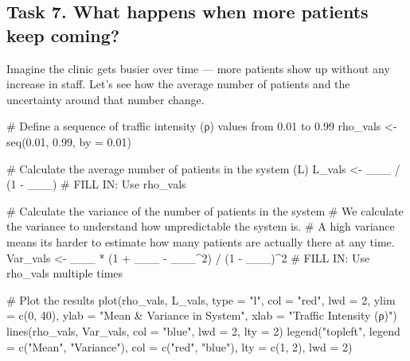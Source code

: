 \documentclass[
]{article}
\newenvironment{Shaded}{\begin{snugshade}}{\end{snugshade}}
\newcommand{\AttributeTok}[1]{\textcolor[rgb]{0.40,0.45,0.13}{#1}}
\newcommand{\CommentTok}[1]{\textcolor[rgb]{0.37,0.37,0.37}{#1}}
\newcommand{\DecValTok}[1]{\textcolor[rgb]{0.68,0.00,0.00}{#1}}
\newcommand{\FloatTok}[1]{\textcolor[rgb]{0.68,0.00,0.00}{#1}}
\newcommand{\FunctionTok}[1]{\textcolor[rgb]{0.28,0.35,0.67}{#1}}
\newcommand{\NormalTok}[1]{\textcolor[rgb]{0.00,0.23,0.31}{#1}}
\newcommand{\OtherTok}[1]{\textcolor[rgb]{0.00,0.23,0.31}{#1}}
\newcommand{\SpecialCharTok}[1]{\textcolor[rgb]{0.37,0.37,0.37}{#1}}
\newcommand{\StringTok}[1]{\textcolor[rgb]{0.13,0.47,0.30}{#1}}
\begin{document}
\subsection{Task 7. What happens when more patients keep
coming?}\label{task-7.-what-happens-when-more-patients-keep-coming}

Imagine the clinic gets busier over time --- more patients show up
without any increase in staff. Let's see how the average number of
patients and the uncertainty around that number change.

\begin{Shaded}
\begin{Highlighting}[]
\CommentTok{\# Define a sequence of traffic intensity (ρ) values from 0.01 to 0.99}
\NormalTok{rho\_vals }\OtherTok{\textless{}{-}} \FunctionTok{seq}\NormalTok{(}\FloatTok{0.01}\NormalTok{, }\FloatTok{0.99}\NormalTok{, }\AttributeTok{by =} \FloatTok{0.01}\NormalTok{)}

\CommentTok{\# Calculate the average number of patients in the system (L)}
\NormalTok{L\_vals }\OtherTok{\textless{}{-}}\NormalTok{ \_\_\_ }\SpecialCharTok{/}\NormalTok{ (}\DecValTok{1} \SpecialCharTok{{-}}\NormalTok{ \_\_\_)   }\CommentTok{\# FILL IN: Use rho\_vals}

\CommentTok{\# Calculate the variance of the number of patients in the system}
\CommentTok{\# We calculate the variance to understand how unpredictable the system is.}
\CommentTok{\# A high variance means it\textquotesingle{}s harder to estimate how many patients are actually there at any time.}
\NormalTok{Var\_vals }\OtherTok{\textless{}{-}}\NormalTok{ \_\_\_ }\SpecialCharTok{*}\NormalTok{ (}\DecValTok{1} \SpecialCharTok{+}\NormalTok{ \_\_\_ }\SpecialCharTok{{-}}\NormalTok{ \_\_\_}\SpecialCharTok{\^{}}\DecValTok{2}\NormalTok{) }\SpecialCharTok{/}\NormalTok{ (}\DecValTok{1} \SpecialCharTok{{-}}\NormalTok{ \_\_\_)}\SpecialCharTok{\^{}}\DecValTok{2}   \CommentTok{\# FILL IN: Use rho\_vals multiple times}

\CommentTok{\# Plot the results}
\FunctionTok{plot}\NormalTok{(rho\_vals, L\_vals, }\AttributeTok{type =} \StringTok{"l"}\NormalTok{, }\AttributeTok{col =} \StringTok{"red"}\NormalTok{, }\AttributeTok{lwd =} \DecValTok{2}\NormalTok{,}
     \AttributeTok{ylim =} \FunctionTok{c}\NormalTok{(}\DecValTok{0}\NormalTok{, }\DecValTok{40}\NormalTok{), }\AttributeTok{ylab =} \StringTok{"Mean \& Variance in System"}\NormalTok{, }\AttributeTok{xlab =} \StringTok{"Traffic Intensity (ρ)"}\NormalTok{)}
\FunctionTok{lines}\NormalTok{(rho\_vals, Var\_vals, }\AttributeTok{col =} \StringTok{"blue"}\NormalTok{, }\AttributeTok{lwd =} \DecValTok{2}\NormalTok{, }\AttributeTok{lty =} \DecValTok{2}\NormalTok{)}
\FunctionTok{legend}\NormalTok{(}\StringTok{"topleft"}\NormalTok{, }\AttributeTok{legend =} \FunctionTok{c}\NormalTok{(}\StringTok{"Mean"}\NormalTok{, }\StringTok{"Variance"}\NormalTok{), }\AttributeTok{col =} \FunctionTok{c}\NormalTok{(}\StringTok{"red"}\NormalTok{, }\StringTok{"blue"}\NormalTok{), }\AttributeTok{lty =} \FunctionTok{c}\NormalTok{(}\DecValTok{1}\NormalTok{, }\DecValTok{2}\NormalTok{), }\AttributeTok{lwd =} \DecValTok{2}\NormalTok{)}
\end{Highlighting}
\end{Shaded}
\end{document}
